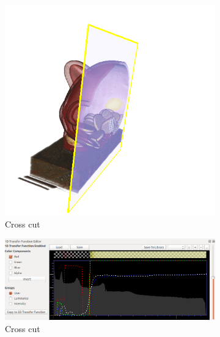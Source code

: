 \documentclass{article}
\begin{document}
\begin{figure}
\begin{subfigure}[h]{0.3\textwidth}
		\includegraphics[width=\textwidth]{pig-clearcut.png}
		\caption{Cross cut}
		\label{fig:cut}
	\end{subfigure}
	\begin{subfigure}[h]{0.5\textwidth}
		\includegraphics[width=\textwidth]{pig-1dt.png}
		\caption{Cross cut}
		\label{fig:1dtf}
	\end{subfigure}
	\begin{subfigure}[h]{0.3\textwidth}

\end{subfigure}
\end{figure}
\end{document}
